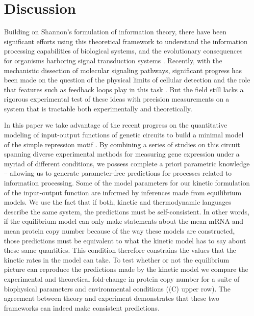 \section*{Discussion}

Building on Shannon's formulation of information theory, there have been
significant efforts using this theoretical framework to understand the
information processing capabilities of biological systems, and the evolutionary
consequences for organisms harboring signal transduction systems
\cite{Bergstrom2004, Taylor2007, Tkacik2008, Polani2009, Nemenman2010,
Rivoire2011}. Recently, with the mechanistic dissection of molecular signaling
pathways, significant progress has been made on the question of the physical
limits of cellular detection and the role that features such as feedback loops
play in this task \cite{Bialek2005, Libby2007, Tkacik2011, Rhee2012a,
Voliotis2014a}. But the field still lacks a rigorous experimental test of these
ideas with precision measurements on a system that is tractable both
experimentally and theoretically.

In this paper we take advantage of the recent progress on the quantitative
modeling of input-output functions of genetic circuits to build a minimal model
of the simple repression motif \cite{Phillips2019}. By combining a series of
studies on this circuit spanning diverse experimental methods for measuring
gene expression under a myriad of different conditions, we possess complete a
priori parametric knowledge -- allowing us to generate parameter-free
predictions for processes related to information processing. Some of the model
parameters for our kinetic formulation of the input-output function are
informed by inferences made from equilibrium models. We use the fact that if
both, kinetic and thermodynamic languages describe the same system, the
predictions must be self-consistent. In other words, if the equilibrium model
can only make statements about the mean mRNA and mean protein copy number
because of the way these models are constructed, those predictions must be
equivalent to what the kinetic model has to say about these same quantities.
This condition therefore constrains the values that the kinetic rates in the
model can take. To test whether or not the equilibrium picture can reproduce
the predictions made by the kinetic model we compare the experimental and
theoretical fold-change in protein copy number for a suite of biophysical
parameters and environmental conditions ((C) upper row).
The agreement between theory and experiment demonstrates that these two
frameworks can indeed make consistent predictions.

